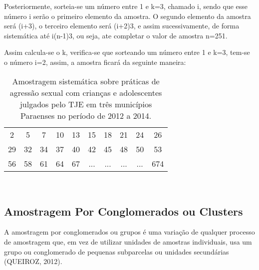 Posteriormente, sorteia-se um número entre 1 e k=3, chamado i, sendo que esse
número i serão o primeiro elemento da amostra. O segundo elemento da amostra será
(i+3), o terceiro elemento será (i+2)3, e assim sucessivamente, de forma sistemática
até i(n-1)3, ou seja, ate completar o valor de amostra n=251.\vskip0.3cm

Assim calcula-se o k, verifica-se que sorteando um número entre 1 e k=3, tem-se
o número i=2, assim, a amostra ficará da seguinte maneira:



\begin{table}[!htb]
    \centering
    {
    \caption{Amostragem sistemática sobre práticas de agressão sexual com crianças e adolescentes julgados pelo TJE em três municípios Paraenses no período de 2012 a 2014.}
    \label{amostras estratificada}
    \vspace{0.1cm}
\begin{tabular}{c|c|c|c|c|c|c|c|c|c}
  \hline\hline
   2  & 5  & 7  & 10 & 13 & 15 & 18 & 21 & 24 & 26 \\
   29 & 32 & 34 & 37 & 40 & 42 & 45 & 48 & 50 & 53 \\
   56 & 58 & 61 & 64 & 67 & ... & ... & ... & ... & 674 \\
  \hline\hline
\end{tabular}}
\\
\hspace{-1.0cm}
\end{table}




\newpage
\subsection{Amostragem Por Conglomerados ou Clusters}

A amostragem por conglomerados ou grupos é uma variação de qualquer processo de amostragem que, em vez de utilizar unidades de amostras individuais, usa um grupo ou conglomerado de pequenas subparcelas ou unidades secundárias (QUEIROZ, 2012).\vskip0.3cm





